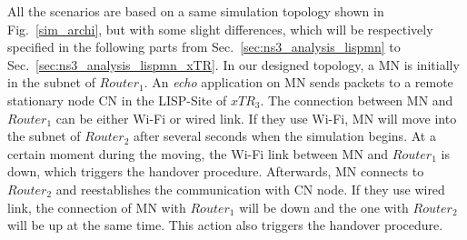 
All the scenarios are based on a same simulation topology shown in Fig.~\ref{sim_archi}, but with some slight differences, which will be respectively specified in the following parts from Sec.~\ref{sec:ns3_analysis_lispmn} to Sec.~\ref{sec:ns3_analysis_lispmn_xTR}. In our designed topology, a MN is initially in the subnet of $Router_1$. An \emph{echo} application on MN sends packets to a remote stationary node CN in the LISP-Site of $xTR_3$. The connection between MN and $Router_1$ can be either Wi-Fi or wired link. If they use Wi-Fi, MN will move into the subnet of $Router_2$ after several seconds when the simulation begins. At a certain moment during the moving, the Wi-Fi link between MN and $Router_1$ is down, which triggers the handover procedure. Afterwards, MN connects to $Router_2$ and reestablishes the communication with CN node. If they use wired link, the connection of MN with $Router_1$ will be down and the one with $Router_2$ will be up at the same time. This action also triggers the handover procedure.

